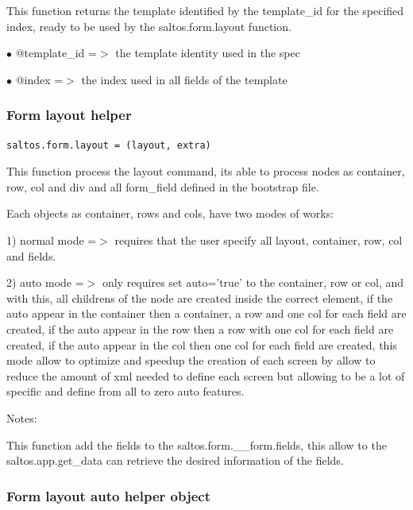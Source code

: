 \documentclass[a4paper]{article}
\begin{document}
This function returns the template identified by the template\_id for the specified index, ready
to be used by the saltos.form.layout function.

\begin{compactitem}
\item[\color{myblue}$\bullet$] @template\_id =$>$ the template identity used in the spec
\item[\color{myblue}$\bullet$] @index       =$>$ the index used in all fields of the template
\end{compactitem}

\hypertarget{toc221}{}
\subsubsection{Form layout helper}

\begin{lstlisting}
saltos.form.layout = (layout, extra)
\end{lstlisting}

This function process the layout command, its able to process nodes as container, row, col and div
and all form\_field defined in the bootstrap file.

Each objects as container, rows and cols, have two modes of works:

1) normal mode =$>$ requires that the user specify all layout, container, row, col and fields.

2) auto mode =$>$ only requires set auto='true' to the container, row or col, and with this, all childrens
of the node are created inside the correct element, if the auto appear in the container then a container,
a row and one col for each field are created, if the auto appear in the row then a row with one col for
each field are created, if the auto appear in the col then one col for each field are created, this mode
allow to optimize and speedup the creation of each screen by allow to reduce the amount of xml needed
to define each screen but allowing to be a lot of specific and define from all to zero auto features.

Notes:

This function add the fields to the saltos.form.\_\_form.fields, this allow to the saltos.app.get\_data
can retrieve the desired information of the fields.

\hypertarget{toc222}{}
\subsubsection{Form layout auto helper object}
\end{document}
